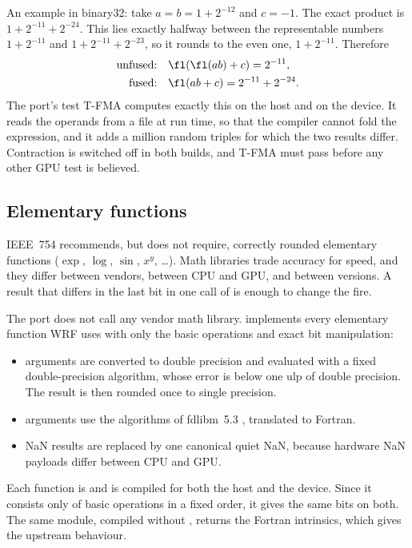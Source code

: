 An example in binary32: take $a = b = 1 + 2^{-12}$ and $c = -1$. The exact product is $1 + 2^{-11} + 2^{-24}$. This
lies exactly halfway between the representable numbers $1 + 2^{-11}$ and $1 + 2^{-11} + 2^{-23}$, so it rounds to
the even one, $1 + 2^{-11}$. Therefore
\begin{align}
  \text{unfused:}\quad & \fl(\fl(a b) + c) = 2^{-11},\\
  \text{fused:}\quad & \fl(a b + c) = 2^{-11} + 2^{-24}.
\end{align}
The port's test T-FMA computes exactly this on the host and on the device. It reads the operands from a file at run
time, so that the compiler cannot fold the expression, and it adds a million random triples for which the two
results differ. Contraction is switched off in both builds, and T-FMA must pass before any other GPU test is
believed.

\subsection{Elementary functions}

IEEE~754 recommends, but does not require, correctly rounded elementary functions ($\exp$, $\log$, $\sin$, $x^y$,
\dots). Math libraries trade accuracy for speed, and they differ between vendors, between CPU and GPU, and between
versions. A result that differs in the last bit in one call of  is enough to change the fire.

The port does not call any vendor math library.  implements every elementary function WRF
uses with only the basic operations and exact bit manipulation:
\begin{itemize}
  \item {} arguments are converted to double precision and evaluated with a fixed double-precision
    algorithm, whose error is below one ulp of double precision. The result is then rounded once to single
    precision.
  \item {} arguments use the algorithms of fdlibm~5.3 \citep{fdlibm}, translated to Fortran.
  \item NaN results are replaced by one canonical quiet NaN, because hardware NaN payloads differ between CPU and
    GPU.
\end{itemize}

Each function is  and is compiled for both the host and the device. Since it consists only of basic
operations in a fixed order, it gives the same bits on both. The same module, compiled without ,
returns the Fortran intrinsics, which gives the upstream behaviour.

